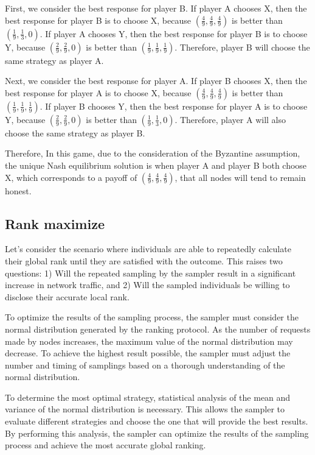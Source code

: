 \documentclass[twocolumn]{article}
\begin{document}
First, we consider the best response for player B. If player A chooses X, then the best response for player B is to choose X, because $(\frac{4}{9}, \frac{4}{9}, \frac{4}{9})$ is better than $(\frac{1}{9}, \frac{1}{3}, 0)$. If player A chooses Y, then the best response for player B is to choose Y, because $(\frac{2}{9}, \frac{2}{9}, 0)$ is better than $(\frac{1}{9}, \frac{1}{9}, \frac{1}{9})$. Therefore, player B will choose the same strategy as player A.

Next, we consider the best response for player A. If player B chooses X, then the best response for player A is to choose X, because $(\frac{4}{9}, \frac{4}{9}, \frac{4}{9})$ is better than $(\frac{1}{9}, \frac{1}{9}, \frac{1}{9})$. If player B chooses Y, then the best response for player A is to choose Y, because $(\frac{2}{9}, \frac{2}{9}, 0)$ is better than $(\frac{1}{9}, \frac{1}{3}, 0)$. Therefore, player A will also choose the same strategy as player B.

Therefore, In this game, due to the consideration of the Byzantine assumption, the unique Nash equilibrium solution is when player A and player B both choose X, which corresponds to a payoff of $(\frac{4}{9}, \frac{4}{9}, \frac{4}{9})$, that all nodes will tend to remain honest.


\subsection{Rank maximize}


Let's consider the scenario where individuals are able to repeatedly calculate their global rank until they are satisfied with the outcome. This raises two questions: 1) Will the repeated sampling by the sampler result in a significant increase in network traffic, and 2) Will the sampled individuals be willing to disclose their accurate local rank.

To optimize the results of the sampling process, the sampler must consider the normal distribution generated by the ranking protocol. As the number of requests made by nodes increases, the maximum value of the normal distribution may decrease. To achieve the highest result possible, the sampler must adjust the number and timing of samplings based on a thorough understanding of the normal distribution.

To determine the most optimal strategy, statistical analysis of the mean and variance of the normal distribution is necessary. This allows the sampler to evaluate different strategies and choose the one that will provide the best results. By performing this analysis, the sampler can optimize the results of the sampling process and achieve the most accurate global ranking.
\end{document}
